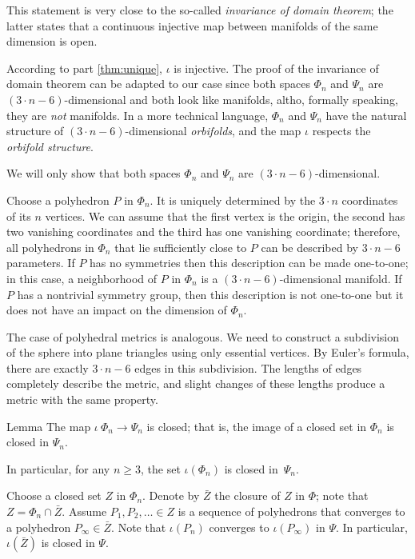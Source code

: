 This statement is very close to the so-called \emph{invariance of domain theorem};
the latter states that a continuous injective map between manifolds of the same dimension is open.

According to part \ref{thm:unique}, $\iota$ is injective.
The proof of the invariance of domain theorem can be adapted to our case since both spaces $\Phi_n$ and $\Psi_n$ are $(3\cdot n-6)$-dimensional and both look like manifolds, altho, formally speaking, they are \textit{not} manifolds.
In a more technical language, $\Phi_n$ and $\Psi_n$ have the natural structure of $(3\cdot n-6)$-dimensional \emph{orbifolds},
and the map $\iota$ respects the {}\emph{orbifold structure}.

We will only show that both spaces $\Phi_n$ and $\Psi_n$ are $(3\cdot n-6)$-dimensional.

Choose a polyhedron $P$ in $\Phi_n$.
It is uniquely determined by the $3\cdot n$ coordinates of its $n$ vertices.
We can assume that the first vertex is the origin, the second has two vanishing coordinates and the third has one vanishing coordinate; therefore, all polyhedrons in $\Phi_n$ that lie sufficiently close to $P$ can be described by $3\cdot n-6$ parameters.
If $P$ has no symmetries then this description can be made one-to-one;
in this case, a neighborhood of $P$ in $\Phi_n$ is a $(3\cdot n-6)$-dimensional manifold.
If $P$ has a nontrivial symmetry group, then this description is not one-to-one but it does not have an impact on the dimension of $\Phi_n$.

The case of polyhedral metrics is analogous.
We need to construct a subdivision of the sphere into plane triangles using only essential vertices.
By Euler's formula, there are exactly $3\cdot n-6$ edges in this subdivision.
The lengths of edges completely describe the metric, and slight changes of these lengths produce a metric with the same property.

\begin{thm}{Lemma}
The map $\iota\:\Phi_n\to\Psi_n$ is closed;
that is, the image of a closed set in $\Phi_n$ is closed in $\Psi_n$.

In particular, for any $n\ge 3$, the set $\iota(\Phi_n)$ is closed in~$\Psi_n$.
\end{thm}

Choose a closed set $Z$ in $\Phi_n$.
Denote by $\bar Z$ the closure of $Z$ in $\Phi$; note that $Z=\Phi_n\cap \bar Z$.
Assume $P_1,P_2,\dots\in Z$ is a sequence of polyhedrons that converges to a polyhedron $P_\infty\in\bar Z$.
Note that $\iota(P_n)$ converges to $\iota(P_\infty)$ in $\Psi$.
In particular, $\iota(\bar Z)$ is closed in $\Psi$.

